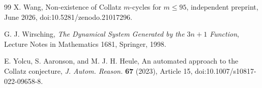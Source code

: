 \documentclass[11pt]{article}
\theoremstyle{definition}
\theoremstyle{remark}
\begin{document}
\begin{thebibliography}{99}
X. Wang,
\newblock Non-existence of Collatz $m$-cycles for $m\le95$,
\newblock independent preprint, June 2026,
\newblock doi:10.5281/zenodo.21017296.

G. J. Wirsching,
\newblock \emph{The Dynamical System Generated by the $3n+1$ Function},
\newblock Lecture Notes in Mathematics 1681, Springer, 1998.

E. Yolcu, S. Aaronson, and M. J. H. Heule,
\newblock An automated approach to the Collatz conjecture,
\newblock \emph{J. Autom. Reason.} \textbf{67} (2023), Article 15,
\newblock doi:10.1007/s10817-022-09658-8.

\end{thebibliography}
\end{document}
